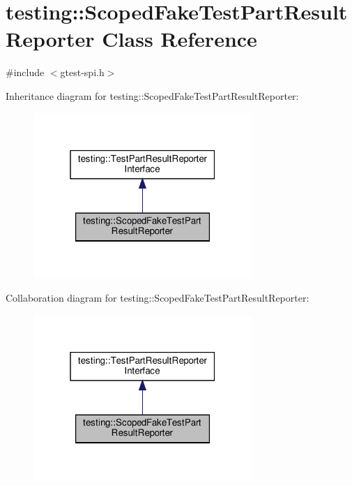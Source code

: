 \hypertarget{classtesting_1_1_scoped_fake_test_part_result_reporter}{}\section{testing\+:\+:Scoped\+Fake\+Test\+Part\+Result\+Reporter Class Reference}
\label{classtesting_1_1_scoped_fake_test_part_result_reporter}


{\ttfamily \#include $<$gtest-\/spi.\+h$>$}



Inheritance diagram for testing\+:\+:Scoped\+Fake\+Test\+Part\+Result\+Reporter\+:
\nopagebreak
\begin{figure}[H]
\begin{center}
\leavevmode
\includegraphics[width=235pt]{classtesting_1_1_scoped_fake_test_part_result_reporter__inherit__graph}
\end{center}
\end{figure}


Collaboration diagram for testing\+:\+:Scoped\+Fake\+Test\+Part\+Result\+Reporter\+:
\nopagebreak
\begin{figure}[H]
\begin{center}
\leavevmode
\includegraphics[width=235pt]{classtesting_1_1_scoped_fake_test_part_result_reporter__coll__graph}
\end{center}
\end{figure}
